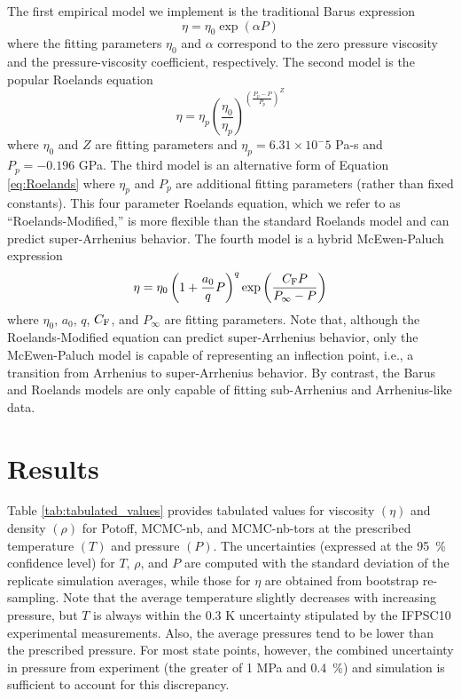 \documentclass[preprint,review,12pt]{elsarticle}
\begin{document}
    The first empirical model we implement is the traditional Barus expression \cite{Barus1893}
	\begin{equation} \label{eq:Barus}
	\eta = \eta_0 \exp(\alpha P)
	\end{equation}
	where the fitting parameters $\eta_0$ and $\alpha$ correspond to the zero pressure viscosity and the pressure-viscosity coefficient, respectively. The second model is the popular Roelands equation \cite{Roelands1966}	
	\begin{equation} \label{eq:Roelands}
	\eta = \eta_p \left(\frac{\eta_0}{\eta_p}\right)^{\left(\frac{P_p - P}{P_p}\right)^Z}
	\end{equation}
	where $\eta_0$ and $Z$ are fitting parameters and $\eta_p = 6.31 \times 10^-5$ Pa-s and $P_p = -0.196$ GPa. The third model is an alternative form of Equation \ref{eq:Roelands} where $\eta_p$ and $P_p$ are additional fitting parameters (rather than fixed constants). This four parameter Roelands equation, which we refer to as ``Roelands-Modified,'' is more flexible than the standard Roelands model and can predict super-Arrhenius behavior. The fourth model is a hybrid McEwen-Paluch expression \cite{Bair2016}	
	\begin{equation} \label{eq:McEwen-Paluch}
	\eta = \eta_0 \left(1 + \frac{a_0}{q} P\right)^q \exp\left(\frac{C_{\rm F} P}{P_\infty - P}\right)
	\end{equation}
	where $\eta_0$, $a_0$, $q$, $C_{\rm F}$, and $P_\infty$ are fitting parameters.  Note that, although the Roelands-Modified equation can predict super-Arrhenius behavior, only the McEwen-Paluch model is capable of representing an inflection point, i.e., a transition from Arrhenius to super-Arrhenius behavior. By contrast, the Barus and Roelands models are only capable of fitting sub-Arrhenius and Arrhenius-like data.
	
		
	\section{Results} \label{Results}    
	
	Table \ref{tab:tabulated_values} provides tabulated values for viscosity $(\eta)$ and density $(\rho)$ for Potoff, MCMC-nb, and MCMC-nb-tors at the prescribed temperature $(T)$ and pressure $(P)$. The uncertainties (expressed at the 95~\% confidence level) for $T$, $\rho$, and $P$ are computed with the standard deviation of the replicate simulation averages, while those for $\eta$ are obtained from bootstrap re-sampling. Note that the average temperature slightly decreases with increasing pressure, but $T$ is always within the 0.3 K uncertainty stipulated by the IFPSC10 experimental measurements. Also, the average pressures tend to be lower than the prescribed pressure. For most state points, however, the combined uncertainty in pressure from experiment (the greater of 1 MPa and 0.4~\%) and simulation is sufficient to account for this discrepancy. 
	
\end{document}
